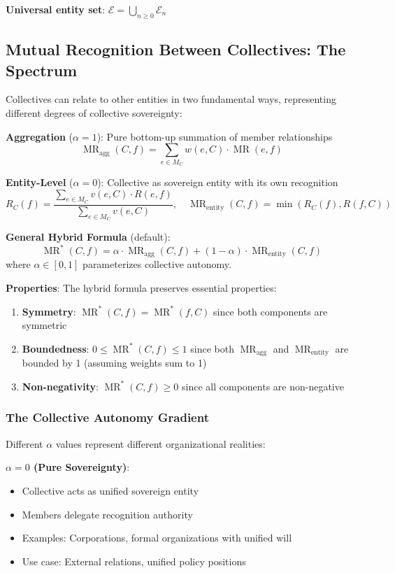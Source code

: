 \documentclass[11pt,a4paper]{article}
\theoremstyle{definition}
\theoremstyle{remark}
\newcommand{\E}{\mathcal{E}}
\DeclareMathOperator{\MR}{MR}
\begin{document}
\textbf{Universal entity set}: $\E = \bigcup_{n \ge 0} \E_n$

\subsection{Mutual Recognition Between Collectives: The Spectrum}

Collectives can relate to other entities in two fundamental ways, representing different degrees of collective sovereignty:

\textbf{Aggregation} ($\alpha = 1$): Pure bottom-up summation of member relationships
\[ \MR_{\text{agg}}(C, f) = \sum_{e \in M_C} w(e, C) \cdot \MR(e, f) \]

\textbf{Entity-Level} ($\alpha = 0$): Collective as sovereign entity with its own recognition
\[ R_C(f) = \frac{\sum_{e \in M_C} v(e, C) \cdot R(e, f)}{\sum_{e \in M_C} v(e, C)}, \quad \MR_{\text{entity}}(C, f) = \min(R_C(f), R(f, C)) \]

\textbf{General Hybrid Formula} (default):
\[ \MR^*(C,f) = \alpha \cdot \MR_{\text{agg}}(C,f) + (1-\alpha) \cdot \MR_{\text{entity}}(C,f) \]
where $\alpha \in [0,1]$ parameterizes collective autonomy.

\textbf{Properties}: The hybrid formula preserves essential properties:
\begin{enumerate}
\item \textbf{Symmetry}: $\MR^*(C,f) = \MR^*(f,C)$ since both components are symmetric
\item \textbf{Boundedness}: $0 \le \MR^*(C,f) \le 1$ since both $\MR_{\text{agg}}$ and $\MR_{\text{entity}}$ are bounded by 1 (assuming weights sum to 1)
\item \textbf{Non-negativity}: $\MR^*(C,f) \ge 0$ since all components are non-negative
\end{enumerate}

\subsubsection{The Collective Autonomy Gradient}

Different $\alpha$ values represent different organizational realities:

\textbf{$\alpha = 0$ (Pure Sovereignty)}:
\begin{itemize}
\item Collective acts as unified sovereign entity
\item Members delegate recognition authority
\item Examples: Corporations, formal organizations with unified will
\item Use case: External relations, unified policy positions
\end{itemize}
\end{document}
